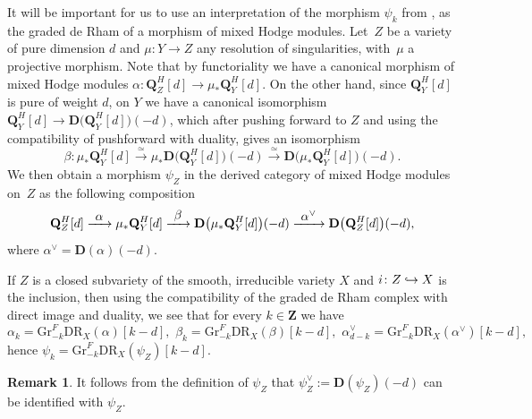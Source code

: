 \documentclass[11pt]{article}
\numberwithin{equation}{section}
\newcommand{\To}[1]{\mathchoice{\xrightarrow{\textstyle\kern4pt#1\kern3pt}}{\stackrel{#1}{\longrightarrow}}{}{}}
\newcommand\hto{\mathrel{\lhook\joinrel\to}}
\let\ts\textstyle
\theoremstyle{plain}
\theoremstyle{definition}
\newtheorem{rmk}[thm]{Remark}
\newcommand\Z{{\mathbf Z}}
\newcommand\Q{{\mathbf Q}}
\newcommand\gr{\mathrm{Gr}}
\newcommand\DR{\mathrm{DR}}
\begin{document}
It will be important for us to use an interpretation of the morphism $\psi_k$ from \cite[App.]{FL2}, as the graded de Rham of a
morphism of mixed Hodge modules. Let~$Z$ be a variety of pure dimension $d$ and $\mu\colon Y\to Z$ any resolution of singularities,
with~$\mu$ a projective morphism.
Note that by functoriality we have a canonical morphism of mixed Hodge modules $\alpha\colon \Q_Z^H[d]\to\mu_*\Q^H_Y[d]$. On the other hand,
since $\Q_Y^H[d]$ is pure of weight $d$,
on $Y$ we have a canonical
isomorphism $\Q_Y^H[d]\to {\mathbf D}\big(\Q_Y^H[d]\big)(-d)$, which after pushing forward to $Z$ and using the compatibility of pushforward with duality,
gives an isomorphism
\[\beta\colon \mu_*\Q_Y^H[d]\overset{\simeq}\longrightarrow \mu_*{\mathbf D}\big(\Q_Y^H[d]\big)(-d)\overset{\simeq}\longrightarrow
{\mathbf D}\big(\mu_*\Q_Y^H[d]\big)(-d).\]
We then obtain a morphism $\psi_Z$ in the derived category of mixed Hodge modules on~$Z$ as the following composition
\begin{equation}\label{eq_psi}
\Q_Z^H[d]\To{\ts\alpha} \mu_*\Q_Y^H[d]\To{\ts\beta} {\mathbf D}\big(\mu_*\Q_Y^H[d]\big)(-d)
\To{\ts\alpha^{\vee}}{\mathbf D}\big(\Q_Z^H[d]\big)(-d),
\end{equation}
where $\alpha^{\vee}={\mathbf D}(\alpha)(-d)$.

If $Z$ is a closed subvariety of the smooth, irreducible variety $X$ and $i\colon Z\hto X$ is the inclusion, then using the compatibility of
the graded de Rham complex with direct image and duality, we see that for every $k\in\Z$ we have
\[\alpha_k=\gr^F_{-k}\DR_X(\alpha)[k-d], \,\,\beta_k=\gr^F_{-k}\DR_X(\beta)[k-d],\,\,\alpha_{d-k}^{\vee}=
\gr^F_{-k}\DR_X(\alpha^{\vee})[k-d],\]
hence $\psi_k=\gr^F_{-k}\DR_X(\psi_Z)[k-d]$.

\begin{rmk}\label{dual_psi}
It follows from the definition of $\psi_Z$ that $\psi_Z^{\vee}:={\mathbf D}(\psi_Z)(-d)$ can be identified with $\psi_Z$.
\end{rmk}
\end{document}

